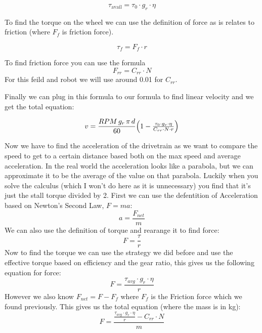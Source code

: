 \documentclass[11pt]{article}
\begin{document}
\[
  \tau_{\mathrm{avail}} = \tau_{0} \cdot g_r \cdot \eta
\]

To find the torque on the wheel we can use the definition of force as is relates to friction (where \(F_{f}\) is friction force).

\[
  \tau_{f} = F_{f} \cdot r
\]

To find friction force you can use the formula
\[
  F_{rr} = C_{rr} \cdot N
\]
For this feild and robot we will use around 0.01 for \(C_{rr}\).

Finally we can plug in this formula to our formula to find linear velocity and we get the total equation:

\[
  v = \frac{RPM\,g_r\,\pi\,d}{60}\Bigl(1 - \tfrac{\tau_{0} \cdot g_r \cdot \eta}{C_{rr} \cdot N \cdot r}\Bigr)
\]

Now we have to find the acceleration of the drivetrain as we want to compare the speed to get to a certain distance based both on the max speed and average acceleration. In the real world the acceleration looks like a parabola, but we can approximate it to be the average of the value on that parabola. Luckily when you solve the calculus (which I won't do here as it is unnecessary) you find that it's just the stall torque divided by 2. First we can use the defentition of Acceleration based on Newton's Second Law, \(F = ma\):
\[
  a = \frac{F_{net}}{m}
\]
We can also use the definition of torque and rearange it to find force:
\[
  F = \frac{\tau}{r}
\]
Now to find the torque we can use the strategy we did before and use the effective torque based on efficiency and the gear ratio, this gives us the following equation for force:
\[
  F = \frac{\tau_{avg} \cdot g_r \cdot \eta}{r}
\]
However we also know \(F_{net} = F - F_f\) where \(F_f\) is the Friction force which we found previously. This gives us the total equation (where the mass is in kg):
\[
  F = \frac{\frac{\tau_{avg} \cdot g_r \cdot \eta}{r} - C_{rr} \cdot N}{m}
\]
\end{document}
